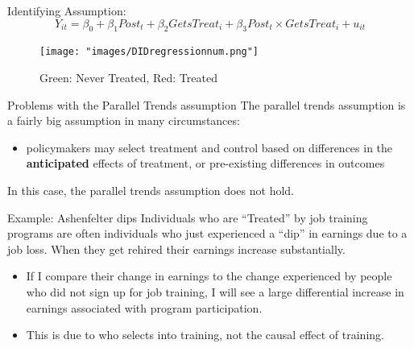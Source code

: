 \documentclass[
  ignorenonframetext,
]{beamer}
\providecommand{\tightlist}{%
  \setlength{\itemsep}{0pt}\setlength{\parskip}{0pt}}
\begin{document}
\begin{frame}{Identifying Assumption:}
\protect\hypertarget{identifying-assumption-1}{}
\[
Y_{it}=\beta_0+\beta_1 Post_t+\beta_2 GetsTreat_i+\beta_3 Post_t\times GetsTreat_i+u_{it}
\]

\begin{figure}
\centering
\texttt{[image: "images/DIDregressionnum.png"]}
\caption{Green: Never Treated, Red: Treated}
\end{figure}
\end{frame}

\begin{frame}{Problems with the Parallel Trends assumption}
\protect\hypertarget{problems-with-the-parallel-trends-assumption}{}
The parallel trends assumption is a fairly big assumption in many
circumstances:

\begin{itemize}
\tightlist
\item
  policymakers may select treatment and control based on differences in
  the \textbf{anticipated} effects of treatment, or pre-existing
  differences in outcomes
\end{itemize}

In this case, the parallel trends assumption does not hold.
\end{frame}

\begin{frame}{Example: Ashenfelter dips}
\protect\hypertarget{example-ashenfelter-dips}{}
Individuals who are ``Treated'' by job training programs are often
individuals who just experienced a ``dip'' in earnings due to a job
loss. When they get rehired their earnings increase substantially.

\begin{itemize}
\item
  If I compare their change in earnings to the change experienced by
  people who did not sign up for job training, I will see a large
  differential increase in earnings associated with program
  participation.
\item
  This is due to who selects into training, not the causal effect of
  training.
\end{itemize}
\end{frame}
\end{document}
